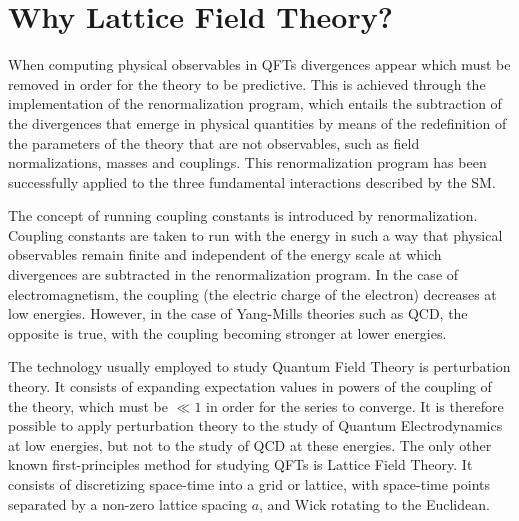 \section*{Why Lattice Field Theory?}

When computing physical observables in QFTs divergences appear which must be removed in order for the theory to be predictive. This is achieved through the implementation of the renormalization program, which entails the subtraction of the divergences that emerge in physical quantities by means of the redefinition of the parameters of the theory that are not observables, such as field normalizations, masses and couplings. This renormalization program has been successfully applied to the three fundamental interactions described by the SM.

The concept of running coupling constants is introduced by renormalization. Coupling constants are taken to run with the energy in such a way that physical observables remain finite and independent of the energy scale at which divergences are subtracted in the renormalization program.  In the case of electromagnetism, the coupling (the electric charge of the electron) decreases at low energies. However, in the case of Yang-Mills theories such as QCD, the opposite is true, with the coupling becoming stronger at lower energies. 

The technology usually employed to study Quantum Field Theory is perturbation theory. It consists of expanding expectation values in powers of the coupling of the theory, which must be $\ll1$ in order for the series to converge. It is therefore possible to apply perturbation theory to the study of Quantum Electrodynamics at low energies, but not to the study of QCD at these energies. The only other known first-principles method for studying QFTs is Lattice Field Theory. It consists of discretizing space-time into a grid or lattice, with space-time points separated by a non-zero lattice spacing $a$, and Wick rotating to the Euclidean. 

